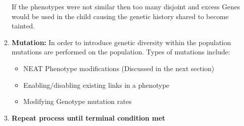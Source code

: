 \documentclass[]{Learning-to-Play-Wolfenstein-thesis}
\begin{document}
\begin{enumerate}
If the phenotypes were not similar then too many disjoint and excess Genes would be used in the child causing the genetic history shared to become tainted.
\item\textbf{Mutation:} In order to introduce genetic diversity within the population mutations are performed on the population. Types of mutations include:
\begin{itemize}
\item NEAT Phenotype modifications (Discussed in the next section)
\item Enabling/disabling existing links in a phenotype
\item Modifying Genotype mutation rates
\end{itemize}
\item\textbf{Repeat process until terminal condition met}
\end{enumerate}
\end{document}
